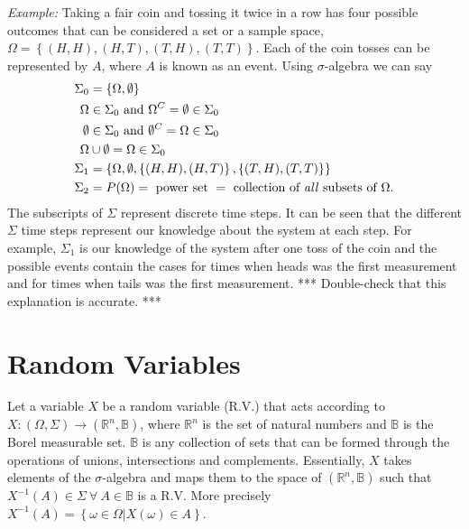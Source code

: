 \documentclass[lecture,12pt,]{pcms-l}
\begin{document}
\textit{Example:} Taking a fair coin and tossing it twice in a row has four possible outcomes that can be considered a set or a sample space, $\Omega = \left\lbrace (H,H), (H,T), (T,H), (T,T) \right\rbrace$. Each of the coin tosses can be represented by $A$, where $A$ is known as an event. Using $\sigma$-algebra we can say
\begin{align*}
\Sigma_0 &= \left\lbrace \Omega, \emptyset \right\rbrace \\
\Omega &\in \Sigma_0 \textnormal{ and } \Omega^C = \emptyset \in \Sigma_0 \\
\emptyset &\in \Sigma_0 \textnormal{ and } \emptyset^C = \Omega \in \Sigma_0 \\
\Omega &\cup \emptyset = \Omega \in \Sigma_0 \\
\Sigma_1 &= \left\lbrace \Omega, \emptyset, \left\lbrace (H,H), (H,T) \right\rbrace, \left\lbrace (T,H), (T,T) \right\rbrace \right\rbrace \\
\Sigma_2 &= P(\Omega) = \textnormal{ power set } = \textnormal{ collection of \textit{all} subsets of } \Omega.
\end{align*}
The subscripts of $\Sigma$ represent discrete time steps. It can be seen that the different $\Sigma$ time steps represent our knowledge about the system at each step. For example, $\Sigma_1$ is our knowledge of the system after one toss of the coin and the possible events contain the cases for times when heads was the first measurement and for times when tails was the first measurement. *** Double-check that this explanation is accurate. ***

\section{Random Variables}
Let a variable $X$ be a random variable (R.V.) that acts according to \\
$X: (\Omega, \Sigma) \to (\mathbb{R}^n, \mathbb{B})$, where $\mathbb{R}^n$ is the set of natural numbers and $\mathbb{B}$ is the Borel measurable set. $\mathbb{B}$ is any collection of sets that can be formed through the operations of unions, intersections and complements. Essentially, $X$ takes elements of the $\sigma$-algebra and maps them to the space of $(\mathbb{R}^n, \mathbb{B})$ such that $X^{-1}(A) \in \Sigma ~ \forall ~ A \in \mathbb{B}$ is a R.V. More precisely $X^{-1}(A) = \left\lbrace \omega \in \Omega | X(\omega) \in A \right\rbrace$.
\end{document}
